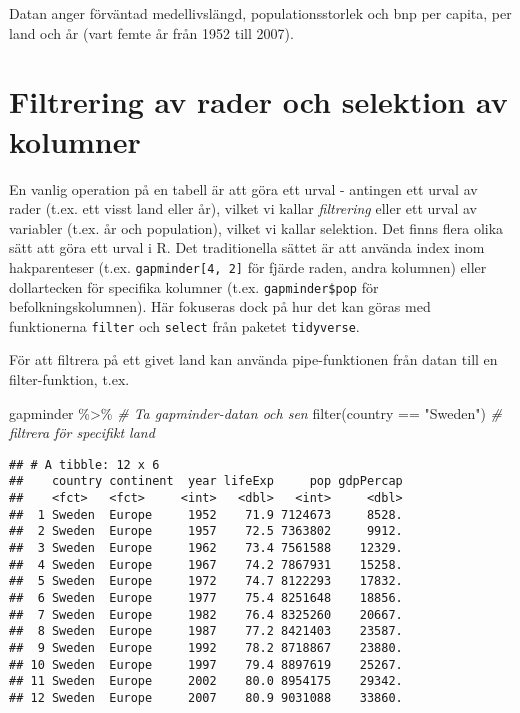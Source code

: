 \documentclass[
]{book}
\newenvironment{Shaded}{\begin{snugshade}}{\end{snugshade}}
\newcommand{\CommentTok}[1]{\textcolor[rgb]{0.56,0.35,0.01}{\textit{#1}}}
\newcommand{\FunctionTok}[1]{\textcolor[rgb]{0.00,0.00,0.00}{#1}}
\newcommand{\NormalTok}[1]{#1}
\newcommand{\SpecialCharTok}[1]{\textcolor[rgb]{0.00,0.00,0.00}{#1}}
\newcommand{\StringTok}[1]{\textcolor[rgb]{0.31,0.60,0.02}{#1}}
\theoremstyle{definition}
\theoremstyle{definition}
\theoremstyle{definition}
\theoremstyle{definition}
\theoremstyle{remark}
\begin{document}
Datan anger förväntad medellivslängd, populationsstorlek och bnp per capita, per land och år (vart femte år från 1952 till 2007).

\hypertarget{filtrering-av-rader-och-selektion-av-kolumner}{%
\section{Filtrering av rader och selektion av kolumner}\label{filtrering-av-rader-och-selektion-av-kolumner}}

En vanlig operation på en tabell är att göra ett urval - antingen ett urval av rader (t.ex. ett visst land eller år), vilket vi kallar \emph{filtrering} eller ett urval av variabler (t.ex. år och population), vilket vi kallar selektion.
Det finns flera olika sätt att göra ett urval i R.
Det traditionella sättet är att använda index inom hakparenteser (t.ex. \texttt{gapminder{[}4,\ 2{]}} för fjärde raden, andra kolumnen) eller dollartecken för specifika kolumner (t.ex. \texttt{gapminder\$pop} för befolkningskolumnen).
Här fokuseras dock på hur det kan göras med funktionerna \texttt{filter} och \texttt{select} från paketet \texttt{tidyverse}.

För att filtrera på ett givet land kan använda pipe-funktionen från datan till en filter-funktion, t.ex.

\begin{Shaded}
\begin{Highlighting}[]
\NormalTok{gapminder }\SpecialCharTok{\%\textgreater{}\%}                 \CommentTok{\# Ta gapminder{-}datan och sen}
  \FunctionTok{filter}\NormalTok{(country }\SpecialCharTok{==} \StringTok{"Sweden"}\NormalTok{) }\CommentTok{\# filtrera för specifikt land}
\end{Highlighting}
\end{Shaded}

\begin{verbatim}
## # A tibble: 12 x 6
##    country continent  year lifeExp     pop gdpPercap
##    <fct>   <fct>     <int>   <dbl>   <int>     <dbl>
##  1 Sweden  Europe     1952    71.9 7124673     8528.
##  2 Sweden  Europe     1957    72.5 7363802     9912.
##  3 Sweden  Europe     1962    73.4 7561588    12329.
##  4 Sweden  Europe     1967    74.2 7867931    15258.
##  5 Sweden  Europe     1972    74.7 8122293    17832.
##  6 Sweden  Europe     1977    75.4 8251648    18856.
##  7 Sweden  Europe     1982    76.4 8325260    20667.
##  8 Sweden  Europe     1987    77.2 8421403    23587.
##  9 Sweden  Europe     1992    78.2 8718867    23880.
## 10 Sweden  Europe     1997    79.4 8897619    25267.
## 11 Sweden  Europe     2002    80.0 8954175    29342.
## 12 Sweden  Europe     2007    80.9 9031088    33860.
\end{verbatim}
\end{document}
